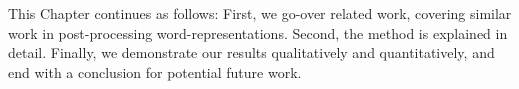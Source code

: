 This Chapter continues as follows: First, we go-over related work, covering similar work in post-processing word-representations. Second, the method is explained in detail. Finally, we demonstrate our results qualitatively and quantitatively, and end with a conclusion for potential future work.







